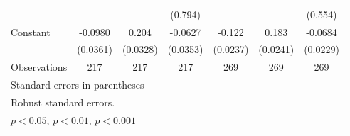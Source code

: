 {\begin{tabular}{l*{6}{c}}
                    &                     &                     &     (0.794)         &                     &                     &     (0.554)         \\
[1em]
Constant            &     -0.0980\sym{**} &       0.204\sym{***}&     -0.0627         &      -0.122\sym{***}&       0.183\sym{***}&     -0.0684\sym{**} \\
                    &    (0.0361)         &    (0.0328)         &    (0.0353)         &    (0.0237)         &    (0.0241)         &    (0.0229)         \\
\hline
Observations        &         217         &         217         &         217         &         269         &         269         &         269         \\
\hline\hline
\multicolumn{7}{l}{\footnotesize Standard errors in parentheses}\\
\multicolumn{7}{l}{\footnotesize Robust standard errors.}\\
\multicolumn{7}{l}{\footnotesize \sym{*} \(p<0.05\), \sym{**} \(p<0.01\), \sym{***} \(p<0.001\)}\\
\end{tabular}
}
